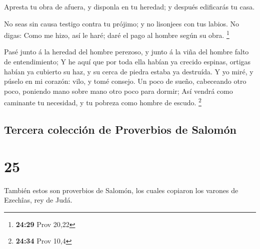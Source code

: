 Apresta tu obra de afuera, y disponla en tu heredad; y
después edificarás tu casa.

 No seas sin causa testigo contra tu prójimo; y no
lisonjees con tus labios.  No digas: Como me hizo, así le
haré; daré el pago al hombre según su obra. \footnote{\textbf{24:29}
  Prov 20,22}

 Pasé junto á la heredad del hombre perezoso, y junto á
la viña del hombre falto de entendimiento;  Y he aquí que
por toda ella habían ya crecido espinas, ortigas habían ya cubierto su
haz, y su cerca de piedra estaba ya destruída.  Y yo
miré, y púselo en mi corazón: vilo, y tomé consejo.  Un
poco de sueño, cabeceando otro poco, poniendo mano sobre mano otro poco
para dormir;  Así vendrá como caminante tu necesidad, y
tu pobreza como hombre de escudo. \footnote{\textbf{24:34} Prov 10,4}

\hypertarget{tercera-colecciuxf3n-de-proverbios-de-salomuxf3n}{%
\subsection{Tercera colección de Proverbios de
Salomón}\label{tercera-colecciuxf3n-de-proverbios-de-salomuxf3n}}

\hypertarget{section-24}{%
\section{25}\label{section-24}}

 También estos son proverbios de Salomón, los cuales
copiaron los varones de Ezechîas, rey de Judá.

